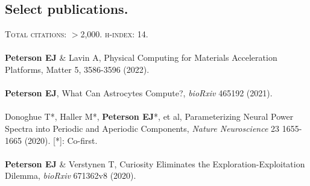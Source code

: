 \documentclass[margin,line]{res}
\begin{document}
\begin{resume}
\section{\sc Select publications.}
\textsc{Total citations}: $>$2,000. \textsc{h-index}: 14.
\\ 
\vspace{-.25cm} 
\\
\textbf{Peterson EJ} \& Lavin A, Physical Computing for Materials Acceleration Platforms, Matter 5, 3586-3596 (2022).
\\ 
\vspace{-.35cm} 
\\
\textbf{Peterson EJ}, What Can Astrocytes Compute?, \emph{bioRxiv} 465192 (2021).
\\ 
\vspace{-.35cm} 
\\
Donoghue T*, Haller M*, \textbf{Peterson EJ}*, et al, Parameterizing Neural Power Spectra into Periodic and Aperiodic Components, \emph{Nature Neuroscience} 23 1655-1665 (2020). [*]: Co-first. 
\\ 
\vspace{-.35cm} 
\\
\textbf{Peterson EJ} \& Verstynen T, Curiosity Eliminates the Exploration-Exploitation Dilemma, \emph{bioRxiv} 671362v8 (2020). 

\end{resume}
\end{document}
